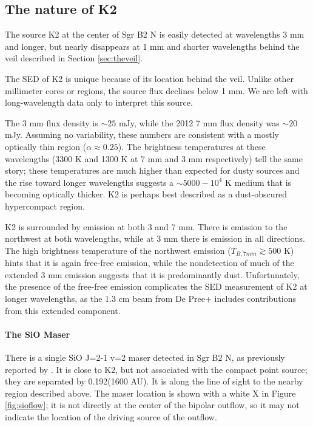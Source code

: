 \documentclass[twocolumn]{aastex61}
\begin{document}


\subsection{The nature of K2}
\label{sec:natureofk2}
The source K2 at the center of Sgr B2 N is easily detected at wavelengths 3 mm
and longer, but nearly disappears at 1 mm and shorter wavelengths behind the
veil described in Section \ref{sec:theveil}.

The SED of K2 is unique because of its location behind the veil.  Unlike other
millimeter cores or \hii regions, the source flux declines below 1 mm.  We are
left with long-wavelength data only to interpret this source.

The 3 mm flux density is $\sim25$ mJy, while the 2012 7 mm flux density was
$\sim20$ mJy.  Assuming no variability, these numbers are consistent with a
mostly optically thin \hii region ($\alpha\approx0.25$).  The brightness
temperatures at these wavelengths (3300 K and 1300 K at 7 mm and 3 mm
respectively) tell the same story; these temperatures are much higher than
expected for dusty sources and the rise toward longer wavelengths suggests a
$\sim5000-10^4$ K medium that is becoming optically thicker.
K2 is perhaps best described as a dust-obscured hypercompact \hii region.

K2 is surrounded by emission at both 3 and 7 mm.  There is emission to the
northwest at both wavelengths, while at 3 mm there is emission in all
directions.  The high brightness temperature of the northwest emission ($T_{B,7
mm}\gtrsim500$ K) hints that it is again free-free emission, while the
nondetection of much of the extended 3 mm emission suggests that it is
predominantly dust.  Unfortunately, the presence of the free-free emission complicates
the SED measurement of K2 at longer wavelengths, as the 1.3 cm beam from De Pree+
includes contributions from this extended component.

\paragraph{The SiO Maser}
There is a single SiO J=2-1 v=2 maser detected in Sgr B2 N, as previously
reported by \citet{Higuchi2015a}.  It is close to K2,
but not associated with the compact point source; they are separated
by 0.192\arcsec (1600 AU).  It is along the
line of sight to the nearby \hii region described above.
The maser location is shown with a white X in Figure \ref{fig:sioflow}; it is
not directly at the center of the bipolar outflow, so it may not indicate
the location of the driving source of the outflow.
\end{document}
